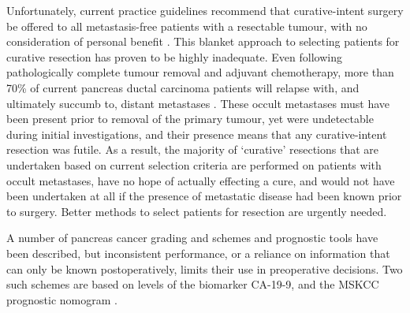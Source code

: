 \documentclass[dissertation.tex]{subfiles}
\begin{document}
Unfortunately, current practice guidelines recommend that curative-intent surgery be offered to all metastasis-free patients with a resectable tumour, with no consideration of personal benefit \cite{Editors2015}.  This blanket approach to selecting patients for curative resection has proven to be highly inadequate.  Even following pathologically complete tumour removal and adjuvant chemotherapy, more than 70\% of current pancreas ductal carcinoma patients will relapse with, and ultimately succumb to, distant metastases \cite{Barugola2007}.  These occult metastases must have been present prior to removal of the primary tumour, yet were undetectable during initial investigations, and their presence means that any curative-intent resection was futile.  As a result, the majority of `curative' resections that are undertaken based on current selection criteria are performed on patients with occult metastases, have no hope of actually effecting a cure, and would not have been undertaken at all if the presence of metastatic disease had been known prior to surgery.  Better methods to select patients for resection are urgently needed.


A number of pancreas cancer grading and schemes and prognostic tools have been described, but inconsistent performance, or a reliance on information that can only be known postoperatively, limits their use in preoperative decisions.  Two such schemes are based on levels of the biomarker \gls{CA-19-9}, and the \gls{MSKCC} prognostic nomogram \cite{Brennan2004}.
\end{document}
